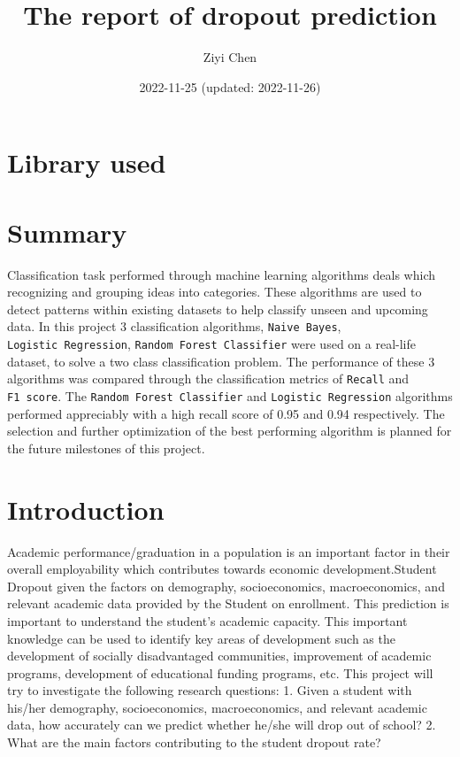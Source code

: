 \documentclass[
]{article}
\title{The report of dropout prediction}
\author{Ziyi Chen}
\date{2022-11-25 (updated: 2022-11-26)}
\begin{document}
\maketitle

{
\setcounter{tocdepth}{2}
\tableofcontents
}
\hypertarget{library-used}{%
\section{Library used}\label{library-used}}

\hypertarget{summary}{%
\section{Summary}\label{summary}}

Classification task performed through machine learning algorithms deals
which recognizing and grouping ideas into categories. These algorithms
are used to detect patterns within existing datasets to help classify
unseen and upcoming data. In this project 3 classification algorithms,
\texttt{Naive\ Bayes}, \texttt{Logistic\ Regression},
\texttt{Random\ Forest\ Classifier} were used on a real-life dataset, to
solve a two class classification problem. The performance of these 3
algorithms was compared through the classification metrics of
\texttt{Recall} and \texttt{F1\ score}. The
\texttt{Random\ Forest\ Classifier} and \texttt{Logistic\ Regression}
algorithms performed appreciably with a high recall score of 0.95 and
0.94 respectively. The selection and further optimization of the best
performing algorithm is planned for the future milestones of this
project.

\hypertarget{introduction}{%
\section{Introduction}\label{introduction}}

Academic performance/graduation in a population is an important factor
in their overall employability which contributes towards economic
development.Student Dropout given the factors on demography,
socioeconomics, macroeconomics, and relevant academic data provided by
the Student on enrollment. This prediction is important to understand
the student's academic capacity. This important knowledge can be used to
identify key areas of development such as the development of socially
disadvantaged communities, improvement of academic programs, development
of educational funding programs, etc. This project will try to
investigate the following research questions: 1. Given a student with
his/her demography, socioeconomics, macroeconomics, and relevant
academic data, how accurately can we predict whether he/she will drop
out of school? 2. What are the main factors contributing to the student
dropout rate?
\end{document}
